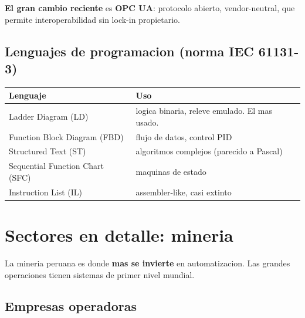 \documentclass[11pt,a4paper,oneside]{report}
\begin{document}
\textbf{El gran cambio reciente} es \textbf{OPC UA}: protocolo abierto,
vendor-neutral, que permite interoperabilidad sin lock-in propietario.

\section{Lenguajes de programacion (norma IEC 61131-3)}

\begin{center}
\begin{tabular}{ll}
\toprule
\textbf{Lenguaje} & \textbf{Uso} \\
\midrule
Ladder Diagram (LD)        & logica binaria, releve emulado. El mas usado. \\
Function Block Diagram (FBD) & flujo de datos, control PID \\
Structured Text (ST)        & algoritmos complejos (parecido a Pascal) \\
Sequential Function Chart (SFC) & maquinas de estado \\
Instruction List (IL)       & assembler-like, casi extinto \\
\bottomrule
\end{tabular}
\end{center}

\chapter{Sectores en detalle: mineria}

La mineria peruana es donde \textbf{mas se invierte} en automatizacion. Las
grandes operaciones tienen sistemas de primer nivel mundial.

\section{Empresas operadoras}
\end{document}

